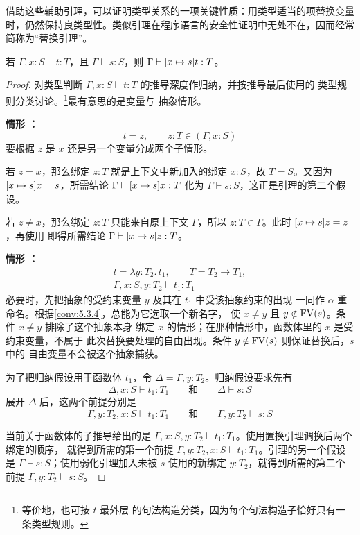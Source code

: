 借助这些辅助引理，可以证明类型关系的一项关键性质：用类型适当的项替换变量
时，仍然保持良类型性。类似引理在程序语言的安全性证明中无处不在，因而经常
简称为“替换引理”。

\begin{lemma}[替换保持类型]
\label{lem:9.3.8}
若 \(\Gamma,x:S\vdash t:T\)，且 \(\Gamma\vdash s:S\)，则
\(\Gamma\vdash[x\mapsto s]t:T\)。
\end{lemma}

\begin{proof}
对类型判断 \(\Gamma,x:S\vdash t:T\) 的推导深度作归纳，并按推导最后使用的
类型规则分类讨论。\footnote{等价地，也可按 \(t\) 最外层
的句法构造分类，因为每个句法构造子恰好只有一条类型规则。}最有意思的是变量与
抽象情形。

\medskip\noindent
\textbf{情形 ：}
\[
t=z,\qquad z:T\in(\Gamma,x:S)
\]
要根据 \(z\) 是 \(x\) 还是另一个变量分成两个子情形。

若 \(z=x\)，那么绑定 \(z:T\) 就是上下文中新加入的绑定 \(x:S\)，故
\(T=S\)。又因为 \([x\mapsto s]x=s\)，所需结论
\(\Gamma\vdash[x\mapsto s]x:T\) 化为
\(\Gamma\vdash s:S\)，这正是引理的第二个假设。

若 \(z\ne x\)，那么绑定 \(z:T\) 只能来自原上下文 \(\Gamma\)，所以
\(z:T\in\Gamma\)。此时 \([x\mapsto s]z=z\)，再使用
 即得所需结论
\(\Gamma\vdash[x\mapsto s]z:T\)。

\medskip\noindent
\textbf{情形 ：}
\[
\begin{gathered}
t=\lambda y:T_2.\,t_1,\qquad T=T_2\to T_1,\\
\Gamma,x:S,y:T_2\vdash t_1:T_1
\end{gathered}
\]
必要时，先把抽象的受约束变量 \(y\) 及其在 \(t_1\) 中受该抽象约束的出现
一同作 \(\alpha\) 重命名。根据\cref{conv:5.3.4}，总能为它选取一个新名字，
使 \(x\ne y\) 且 \(y\notin\operatorname{FV}(s)\)。条件 \(x\ne y\) 排除了这个抽象本身
绑定 \(x\) 的情形；在那种情形中，函数体里的 \(x\) 是受约束变量，不属于
此次替换要处理的自由出现。条件 \(y\notin\operatorname{FV}(s)\) 则保证替换后，\(s\) 中的
自由变量不会被这个抽象捕获。

为了把归纳假设用于函数体 \(t_1\)，令
\(\Delta=\Gamma,y:T_2\)。归纳假设要求先有
\[
\Delta,x:S\vdash t_1:T_1
\qquad\text{和}\qquad
\Delta\vdash s:S
\]
展开 \(\Delta\) 后，这两个前提分别是
\[
\Gamma,y:T_2,x:S\vdash t_1:T_1
\qquad\text{和}\qquad
\Gamma,y:T_2\vdash s:S
\]

当前关于函数体的子推导给出的是
\(\Gamma,x:S,y:T_2\vdash t_1:T_1\)。使用置换引理调换后两个绑定的顺序，
就得到所需的第一个前提
\(\Gamma,y:T_2,x:S\vdash t_1:T_1\)。引理的另一个假设是
\(\Gamma\vdash s:S\)；使用弱化引理加入未被 \(s\) 使用的新绑定
\(y:T_2\)，就得到所需的第二个前提
\(\Gamma,y:T_2\vdash s:S\)。


\end{proof}
